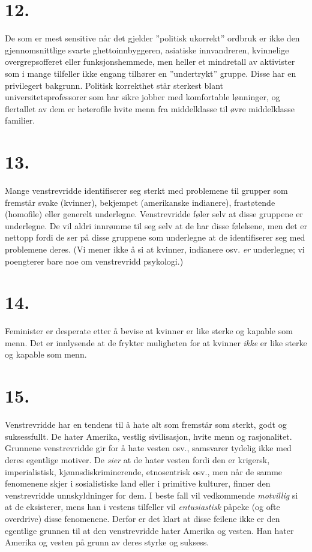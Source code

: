 \documentclass[oneside]{book}
\begin{document}
\section*{12.}
De som er mest sensitive når det gjelder ''politisk ukorrekt'' ordbruk er ikke den gjennomsnittlige svarte ghettoinnbyggeren, asiatiske innvandreren, kvinnelige overgrepsofferet eller funksjonshemmede, men heller et mindretall av aktivister som i mange tilfeller ikke engang tilhører en ''undertrykt'' gruppe. Disse har en privilegert bakgrunn. Politisk korrekthet står sterkest blant universitetsprofessorer som har sikre jobber med komfortable lønninger, og flertallet av dem er heterofile hvite menn fra middelklasse til øvre middelklasse familier.

\section*{13.}
Mange venstrevridde identifiserer seg sterkt med problemene til grupper som fremstår svake (kvinner), bekjempet (amerikanske indianere), frastøtende (homofile) eller generelt underlegne. Venstrevridde føler selv at disse gruppene er underlegne. De vil aldri innrømme til seg selv at de har disse følelsene, men det er nettopp fordi de ser på disse gruppene som underlegne at de identifiserer seg med problemene deres. (Vi mener ikke å si at kvinner, indianere osv. {\em er} underlegne; vi poengterer bare noe om venstrevridd psykologi.)

\section*{14.}
Feminister er desperate etter å bevise at kvinner er like sterke og kapable som menn. Det er innlysende at de frykter muligheten for at kvinner {\em ikke} er like sterke og kapable som menn.

\section*{15.}
Venstrevridde har en tendens til å hate alt som fremstår som sterkt, godt og suksessfullt. De hater Amerika, vestlig sivilisasjon, hvite menn og rasjonalitet. Grunnene venstrevridde gir for å hate vesten osv., samsvarer tydelig ikke med deres egentlige motiver. De {\em sier} at de hater vesten fordi den er krigersk, imperialistisk, kjønnsdiskriminerende, etnosentrisk osv., men når de samme fenomenene skjer i sosialistiske land eller i primitive kulturer, finner den venstrevridde unnskyldninger for dem. I beste fall vil vedkommende {\em motvillig} si at de eksisterer, mens han i vestens tilfeller vil {\em entusiastisk} påpeke (og ofte overdrive) disse fenomenene. Derfor er det klart at disse feilene ikke er den egentlige grunnen til at den venstrevridde hater Amerika og vesten. Han hater Amerika og vesten på grunn av deres styrke og suksess.
\end{document}

